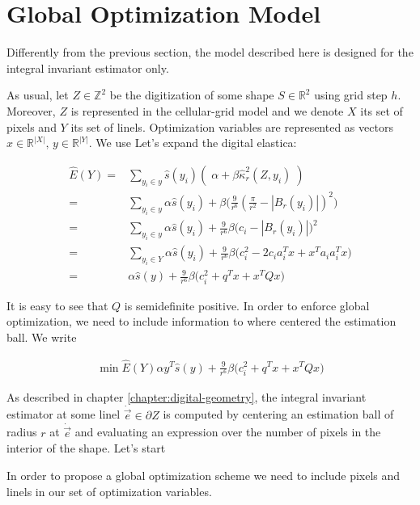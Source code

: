 \section{Global Optimization Model}

Differently from the previous section, the model described here is designed for the integral invariant estimator only.

As usual, let $Z \in \mathbb{Z}^2$ be the digitization of some shape $S \in \mathbb{R}^2$ using grid step $h$. Moreover, $Z$ is represented in the cellular-grid model and we denote $X$ its set of pixels and $Y$ its set of linels. Optimization variables are represented as vectors $x \in \mathbb{R}^{|X|},\, y \in \mathbb{R}^{|Y|}$.  We use  Let's expand the digital elastica:


\begin{align}
	\hat{E}(Y) =& \sum_{y_i \in y}{ \hat{s}(y_i)\left(\; \alpha + \beta \hat{\kappa}_{r}^2(Z,y_i) \; \right)}\\\nonumber
			   =& \sum_{y_i \in y} \alpha \hat{s}(y_i) + \beta \big( \frac{9}{r^6}(\frac{\pi}{r^2} - |B_r(y_i)|)^2\big)\\\nonumber
			   =& \sum_{y_i \in y} \alpha \hat{s}(y_i) + \frac{9}{r^6}\beta \big(c_i - |B_r(y_i)|\big)^2\\\nonumber
			   =& \sum_{y_i \in Y} \alpha \hat{s}(y_i) + \frac{9}{r^6}\beta \big(c_i^2 - 2c_ia_i^Tx + x^Ta_ia_i^Tx\big)\\\nonumber			   
			   =& \alpha \hat{s}(y) + \frac{9}{r^6}\beta \big(c_i^2 + q^Tx + x^TQx\big)
	\end{align}
	
	It is easy to see that $Q$ is semidefinite positive. In order to enforce global optimization, we need to include information to where centered the estimation ball. We write
	
	\begin{align*}
		\min \hat{E}(Y) \alpha y^T\hat{s}(y) + \frac{9}{r^6}\beta \big(c_i^2 + q^Tx + x^TQx\big)
	\end{align*}
	

 As described in chapter \ref{chapter:digital-geometry}, the integral invariant estimator at some linel $\dot{\vec{e}} \in \partial Z$ is computed by centering an estimation ball of radius $r$ at $\dot{\vec{e}}$ and evaluating an expression over the number of pixels in the interior of the shape. Let's start 



In order to propose a global optimization scheme we need to include pixels and linels in our set of optimization variables. 


